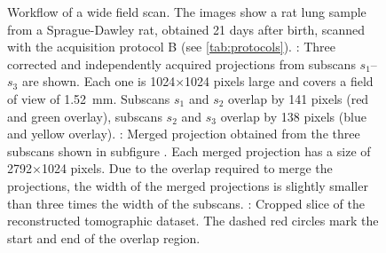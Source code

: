 \begin{figure}[p]
{{%
			\label{subfig:workflow-reconstruction}%
		}%
	}%
	\caption[Workflow of a wide field scan]{Workflow of a wide field scan. The images show a rat lung sample from a Sprague-Dawley rat, obtained 21 days after birth, scanned with the acquisition protocol B (see \autoref{tab:protocols}). %
			: Three corrected and independently acquired projections from subscans $s_1$--$s_3$ are shown. Each one is 1024\(\times\)1024 pixels large and covers a field of view of \SI{1.52}{\milli\meter}. Subscans $s_1$ and $s_2$ overlap by 141 pixels (red and green overlay), subscans $s_2$ and $s_3$ overlap by 138 pixels (blue and yellow overlay). %
			: Merged projection obtained from the three subscans shown in subfigure . Each merged projection has a size of 2792\(\times\)1024 pixels. Due to the overlap required to merge the projections, the width of the merged projections is slightly smaller than three times the width of the subscans. %
			: Cropped slice of the reconstructed tomographic dataset. The dashed red circles mark the start and end of the overlap region.}
	\label{fig:wide-field-scan-results}
\end{figure}%

